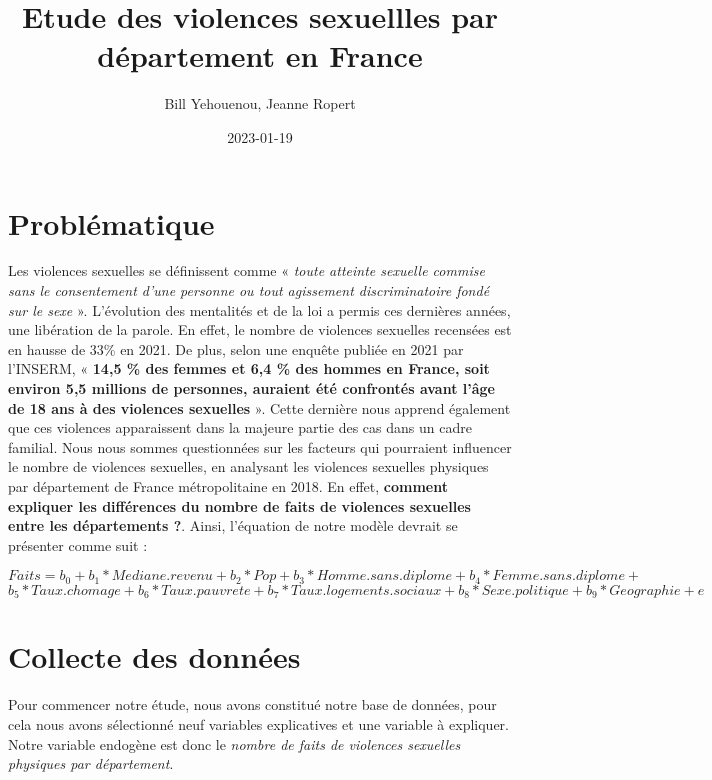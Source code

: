 \documentclass[
]{article}
\title{Etude des violences sexuellles par département en France}
\author{Bill Yehouenou, Jeanne Ropert}
\date{2023-01-19}
\begin{document}
\maketitle

{
\setcounter{tocdepth}{2}
\tableofcontents
}
\newpage

\hypertarget{probluxe9matique}{%
\section{Problématique}\label{probluxe9matique}}

Les violences sexuelles se définissent comme « \emph{toute atteinte
sexuelle commise sans le consentement d'une personne ou tout agissement
discriminatoire fondé sur le sexe} ». L'évolution des mentalités et de
la loi a permis ces dernières années, une libération de la parole. En
effet, le nombre de violences sexuelles recensées est en hausse de 33\%
en 2021. De plus, selon une enquête publiée en 2021 par l'INSERM, «
\textbf{14,5 \% des femmes et 6,4 \% des hommes en France, soit environ
5,5 millions de personnes, auraient été confrontés avant l'âge de 18 ans
à des violences sexuelles} ». Cette dernière nous apprend également que
ces violences apparaissent dans la majeure partie des cas dans un cadre
familial. Nous nous sommes questionnées sur les facteurs qui pourraient
influencer le nombre de violences sexuelles, en analysant les violences
sexuelles physiques par département de France métropolitaine en 2018. En
effet, \textbf{comment expliquer les différences du nombre de faits de
violences sexuelles entre les départements ?}. Ainsi, l'équation de
notre modèle devrait se présenter comme suit :

\[ Faits=b_0+b_1*Mediane.revenu+b_2*Pop+b_3*Homme.sans.diplome+b_4*Femme.sans.diplome+\]
\[ b_5*Taux.chomage+b_6*Taux.pauvrete+b_7*Taux.logements.sociaux+b_8*Sexe.politique+b_9*Geographie+e \]

\hypertarget{collecte-des-donnuxe9es}{%
\section{Collecte des données}\label{collecte-des-donnuxe9es}}

Pour commencer notre étude, nous avons constitué notre base de données,
pour cela nous avons sélectionné neuf variables explicatives et une
variable à expliquer. Notre variable endogène est donc le \emph{nombre
de faits de violences sexuelles physiques par département}.
\end{document}
